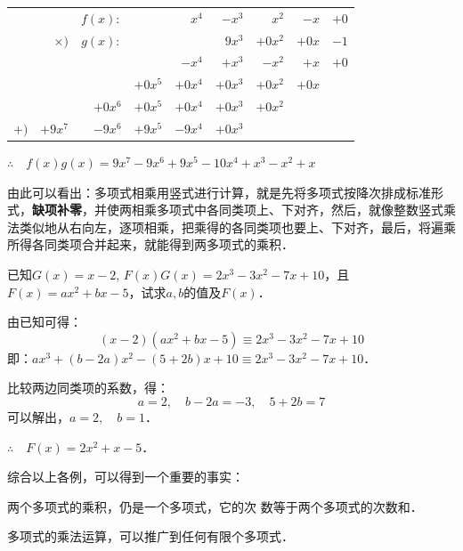 \begin{center}
    \begin{tabular}{rrrrrrrrr}
      &        &    $f(x):$    &        &    $x^4$    &    $-x^3$    &    $x^2$    &    $-x$    &    $+0$\\
&    $\times)$    &    $g(x):$    &        &        &    $9x^3$    &    $+0x^2$    &    $+0x$    &    $-1$\\
\hline
&        &        &        &    $-x^4$    &    $+x^3$    &    $-x^2$    &    $+x$    &    $+0$\\
&        &        &    $+0x^5$    &    $+0x^4$    &    $+0x^3$    &    $+0x^2$    &    $+0x$    &    \\
&        &    $+0x^6$    &    $+0x^5$    &    $+0x^4$    &    $+0x^3$    &    $+0x^2$    &        &    \\
$+)$    &    $+9x^7$    &    $-9x^6$    &    $+9x^5$    &    $-9x^4$    &    $+0x^3$    &        &        &    \\
\hline
\end{tabular}
\end{center} 

        $\therefore\quad f(x)g(x)=9x^7-9x^6+9x^5-10x^4+x^3-x^2+x$

由此可以看出：多项式相乘用竖式进行计算，就是先将多项式按降次排成标准形式，\textbf{缺项补零}，并使两相乘多项式中各同类项上、下对齐，然后，就像整数竖式乘法类似地从右向左，逐项相乘，把乘得的各同类项也要上、下对齐，最后，将遍乘所得各同类项合并起来，就能得到两多项式的乘积．

\begin{example}
    已知$G(x)=x-2$, $F(x)G(x)=2x^3-3x^2-7x+10$，且$F(x)=ax^2+bx-5$，试求$a,b$的值及$F(x)$．
\end{example}

\begin{solution}
    由已知可得：
    \[(x-2)(ax^2+bx-5)\equiv 2x^3-3x^2-7x+10 \]
    即：$ax^3+(b-2a)x^2-(5+2b)x+10\equiv 2x^3-3x^2-7x+10$．

    比较两边同类项的系数，得：
    \[a=2,\quad b-2a=-3,\quad 5+2b=7 \]
    可以解出，$a=2,\quad b=1$．

    $\therefore\quad F(x)=2x^2+x-5$．
\end{solution}

综合以上各例，可以得到一个重要的事实：
\begin{blk}{}
    两个多项式的乘积，仍是一个多项式，它的次
数等于两个多项式的次数和．
\end{blk}

多项式的乘法运算，可以推广到任何有限个多项式．

